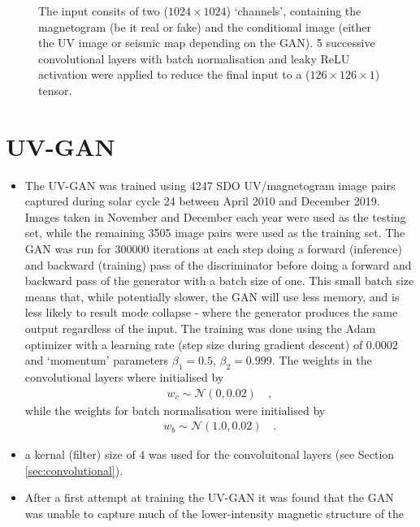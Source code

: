 \documentclass[11pt,a4paper,onecolumn]{report}
\begin{document}
\begin{figure}
  \centering
  \caption{
    The input consits of two ($1024\times 1024$) `channels', containing the
    magnetogram (be it real or fake) and the conditional image (either the UV
    image or seismic map depending on the GAN). 5 successive convolutional
    layers with batch normalisation and leaky ReLU activation were applied to
    reduce the final input to a ($126\times 126 \times 1$) tensor.
  }
  \label{fig:discrim_model}
\end{figure}



\section{UV-GAN}
\begin{itemize}
  \item The UV-GAN was trained using 4247 SDO UV/magnetogram image pairs
  captured during solar cycle 24 between April 2010 and December 2019. Images
  taken in November and December each year were used as the testing set, while
  the remaining 3505 image pairs were used as the training set. The GAN was run
  for $300000$ iterations at each step doing a forward (inference) and backward
  (training) pass of the discriminator before doing a forward and backward pass
  of the generator with a batch size of one. This small batch size means that,
  while potentially slower, the GAN will use less memory, and is less likely to
  result mode collapse - where the generator produces the same output regardless
  of the input. The training was done using the Adam optimizer
  \citep{kingma_adam_2014} with a learning rate (step size during gradient
  descent) of $0.0002$ and `momentum' parameters $\beta_1 = 0.5$, $\beta_2 =
  0.999$. The weights in the convolutional layers where initialised by
  \begin{align}
    w_c \sim \mathcal{N}\left(0, 0.02\right) \quad ,
  \end{align}
  while the weights for batch normalisation were initialised by
  \begin{align}
    w_b \sim \mathcal{N}\left(1.0, 0.02\right) \quad .
  \end{align}
  \item a kernal (filter) size of $4$ was used for the convoluitonal layers (see
  Section \ref{sec:convolutional}).
  \item After a first attempt at training the UV-GAN it was found that the GAN
  was unable to capture much of the lower-intensity magnetic structure of the

\end{itemize}
\end{document}
